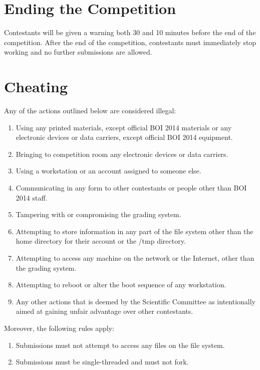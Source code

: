 \documentclass[a5paper,10pt,twoside]{book}
\begin{document}
\section{Ending the Competition}

Contestants will be given a warning both 30 and 10 minutes before the end of the
competition. After the end of the competition, contestants must immediately stop
working and no further submissions are allowed.

\section{Cheating}

Any of the actions outlined below are considered illegal:

\begin{enumerate}
    \item Using any printed materials, except official BOI 2014 materials or any
    electronic devices or data carriers, except official BOI 2014 equipment.
    \item Bringing to competition room any electronic devices or data carriers.
    \item Using a workstation or an account assigned to someone else.
    \item Communicating in any form to other contestants or people other than
    BOI 2014 staff.
    \item Tampering with or compromising the grading system.
    \item Attempting to store information in any part of the file system other
    than the home directory for their account or the /tmp directory.
    \item Attempting to access any machine on the network or the Internet, other
    than the grading system.
    \item Attempting to reboot or alter the boot sequence of any workstation.
    \item Any other actions that is deemed by the Scientific Committee as
    intentionally aimed at gaining unfair advantage over other contestants.
\end{enumerate}

Moreover, the following rules apply:

\begin{enumerate}
\item Submissions must not attempt to access any files on the file system.
\item Submissions must be single-threaded and must not fork.
\end{enumerate}
\end{document}
